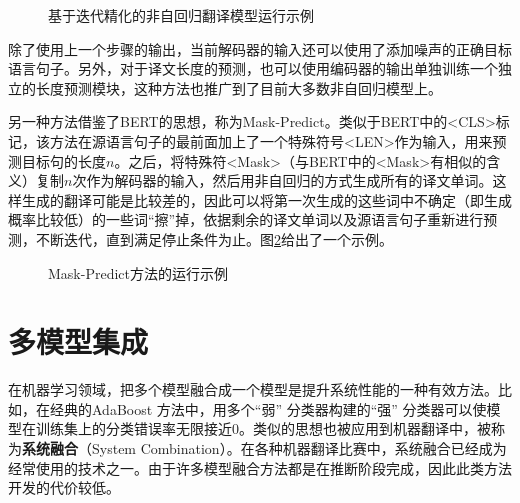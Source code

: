 \begin{figure}[htp]
\centering

\caption{基于迭代精化的非自回归翻译模型运行示例}
\label{fig:14-18}
\end{figure}

\parinterval 除了使用上一个步骤的输出，当前解码器的输入还可以使用了添加噪声的正确目标语言句子。另外，对于译文长度的预测，也可以使用编码器的输出单独训练一个独立的长度预测模块，这种方法也推广到了目前大多数非自回归模型上。

\parinterval 另一种方法借鉴了BERT的思想，称为Mask-Predict。类似于BERT中的<CLS>标记，该方法在源语言句子的最前面加上了一个特殊符号<LEN>作为输入，用来预测目标句的长度$n$。之后，将特殊符<Mask>（与BERT中的<Mask>有相似的含义）复制$n$次作为解码器的输入，然后用非自回归的方式生成所有的译文单词。这样生成的翻译可能是比较差的，因此可以将第一次生成的这些词中不确定（即生成概率比较低）的一些词“擦”掉，依据剩余的译文单词以及源语言句子重新进行预测，不断迭代，直到满足停止条件为止。图\ref{fig:14-19}给出了一个示例。

\begin{figure}[htp]
\centering

\caption{Mask-Predict方法的运行示例}
\label{fig:14-19}
\end{figure}

\sectionnewpage
\section{多模型集成}\label{sec:14-5}

\parinterval 在机器学习领域，把多个模型融合成一个模型是提升系统性能的一种有效方法。比如，在经典的AdaBoost 方法中，用多个“弱” 分类器构建的“强” 分类器可以使模型在训练集上的分类错误率无限接近0。类似的思想也被应用到机器翻译中，被称为{\small\sffamily\bfseries{系统融合}}（System Combination）。在各种机器翻译比赛中，系统融合已经成为经常使用的技术之一。由于许多模型融合方法都是在推断阶段完成，因此此类方法开发的代价较低。


